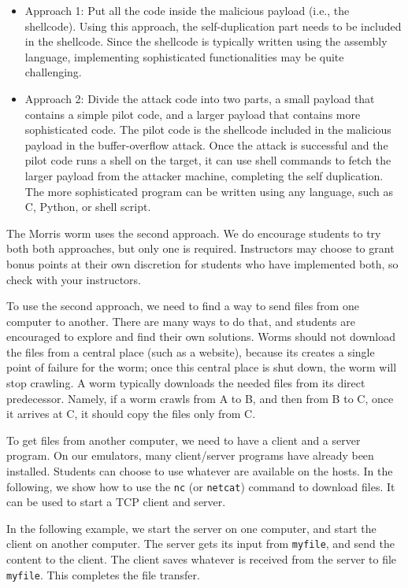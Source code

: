 \begin{itemize}
  \item Approach 1: Put all the code inside the 
    malicious payload (i.e., the shellcode). Using this approach,
    the self-duplication part needs to be included 
    in the shellcode. Since the shellcode is typically written using 
    the assembly language, implementing sophisticated 
    functionalities may be quite challenging.

  \item Approach 2: Divide the attack code into two
    parts, a small payload that contains a simple pilot code, 
    and a larger payload that contains more sophisticated code. 
    The pilot code is the shellcode included in the malicious payload 
    in the buffer-overflow attack. 
    Once the attack is successful and the pilot code runs a shell
    on the target, it can  use shell commands to fetch the larger payload 
    from the attacker machine, completing the self duplication. 
    The more sophisticated program can be written using any language,
    such as C, Python, or shell script. 
\end{itemize}

The Morris worm uses the second approach. We do encourage 
students to try both both approaches, but only one is required. 
Instructors may choose to grant bonus points at their own
discretion for students who have implemented both, 
so check with your instructors.  


To use the second approach, we need to find a way to send
files from one computer to another. There are many ways to do that,
and students are encouraged to explore and find their own solutions.
Worms should not download the files from a central 
place (such as a website), because its creates a single point of failure 
for the worm; once this central place is shut down, the 
worm will stop crawling. A worm typically downloads the needed files from
its direct predecessor. Namely, if a worm crawls from A to B, 
and then from B to C, once it arrives at C, it should
copy the files only from C. 


To get files from another computer, we need to have a client 
and a server program. On our emulators, many client/server programs
have already been installed. Students can choose to use
whatever are available on the hosts. In the following, 
we show how to use the \texttt{nc} (or \texttt{netcat})  
command to download files. 
It can be used to start a TCP client and server. 

In the following example, we start the server on one computer,
and start the client on another computer. The server gets its input
from \texttt{myfile}, and send the content to the client. 
The client saves
whatever is received from the server to file \texttt{myfile}. This completes
the file transfer.

